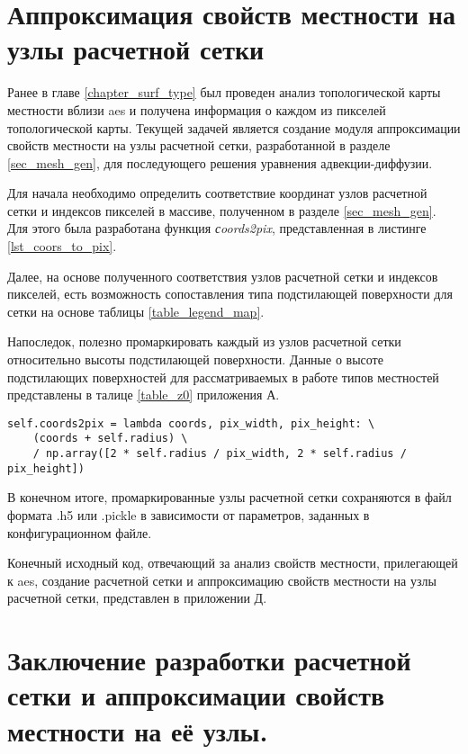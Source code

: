 \section{Аппроксимация свойств местности на узлы расчетной сетки}

Ранее в главе \ref{chapter_surf_type} был проведен анализ топологической карты местности вблизи \ac{aes} и получена 
информация о каждом из пикселей топологической карты. Текущей задачей является создание модуля аппроксимации свойств 
местности на узлы расчетной сетки, разработанной в разделе \ref{sec_mesh_gen}, для последующего решения уравнения 
адвекции-диффузии.

Для начала необходимо определить соответствие координат узлов расчетной сетки и индексов пикселей в массиве, полученном 
в разделе \ref{sec_mesh_gen}. Для этого была разработана функция \textit{сoords2pix}, представленная в листинге 
\ref{lst_coors_to_pix}.

Далее, на основе полученного соответствия узлов расчетной сетки и индексов пикселей, есть возможность сопоставления типа 
подстилающей поверхности для сетки на основе таблицы \ref{table_legend_map}. 

Напоследок, полезно промаркировать каждый из узлов расчетной сетки относительно высоты подстилающей поверхности. Данные 
о высоте подстилающих поверхностей для рассматриваемых в работе типов местностей представлены в талице \ref{table_z0} 
приложения А. 

\begin{lstlisting}[caption=Функция перевода координат узлов расчетной сетки в индексы пикселей., 
					label={lst_coors_to_pix}, basicstyle=\footnotesize]
self.coords2pix = lambda coords, pix_width, pix_height: \
    (coords + self.radius) \
    / np.array([2 * self.radius / pix_width, 2 * self.radius / pix_height])
\end{lstlisting}

В конечном итоге, промаркированные узлы расчетной сетки сохраняются в файл формата .h5 или .pickle в зависимости от 
параметров, заданных в конфигурационном файле. 

Конечный исходный код, отвечающий за анализ свойств местности, прилегающей к \ac{aes}, создание расчетной сетки и 
аппроксимацию свойств местности на узлы расчетной сетки, представлен в приложении Д.

\section{Заключение разработки расчетной сетки и аппроксимации свойств местности на её узлы.}

